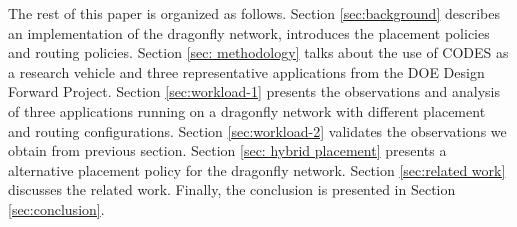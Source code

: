 The rest of this paper is organized as follows. Section \ref{sec:background} describes an implementation of the dragonfly network, introduces the placement policies and routing policies. Section \ref{sec: methodology} talks about the use of CODES as a research vehicle and three representative applications from the DOE Design Forward Project. Section \ref{sec:workload-1} presents the observations and analysis of three applications running on a dragonfly network with different placement and routing configurations. Section \ref{sec:workload-2} validates the observations we obtain from previous section. Section \ref{sec: hybrid placement} presents a alternative placement policy for the dragonfly network. Section \ref{sec:related work} discusses the related work. Finally, the conclusion is presented in Section \ref{sec:conclusion}.


